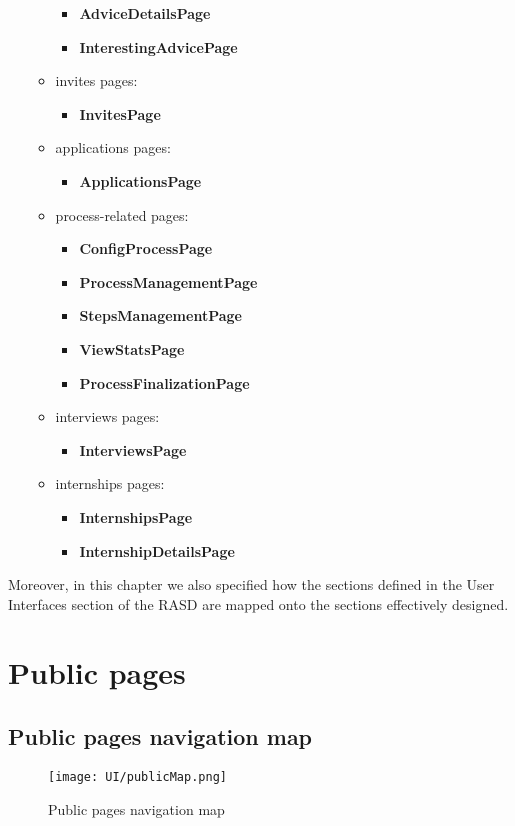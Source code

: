 \begin{itemize}
\begin{itemize}
\begin{itemize}
				\item \textbf{AdviceDetailsPage}
				\item \textbf{InterestingAdvicePage}
			\end{itemize}
			\item invites pages:
			\begin{itemize}
				\item \textbf{InvitesPage}
			\end{itemize}
			\item applications pages:
			\begin{itemize}
				\item \textbf{ApplicationsPage}
			\end{itemize}
			\item process-related pages:
			\begin{itemize}
				\item \textbf{ConfigProcessPage}
				\item \textbf{ProcessManagementPage}
				\item \textbf{StepsManagementPage}
				\item \textbf{ViewStatsPage}
				\item \textbf{ProcessFinalizationPage}
			\end{itemize}
			\item interviews pages:
			\begin{itemize}
				\item \textbf{InterviewsPage}
			\end{itemize}
			\item internships pages:
			\begin{itemize}
				\item \textbf{InternshipsPage}
				\item \textbf{InternshipDetailsPage}
			\end{itemize}
		\end{itemize}
	\end{itemize}
	
	Moreover, in this chapter we also specified how the sections defined in the User Interfaces section of the RASD are mapped onto the sections effectively designed.
	
	\section{Public pages}
	\subsection{Public pages navigation map}
	\begin{figure}[H]
		\centering
		\caption{Public pages navigation map}
		\texttt{[image: UI/publicMap.png]}
	\end{figure}
